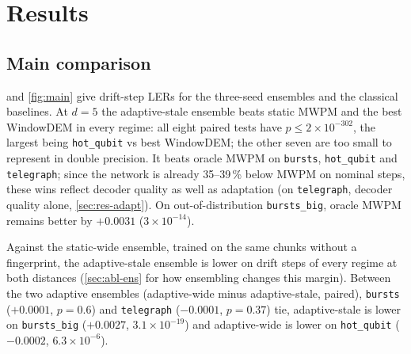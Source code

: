 \documentclass[11pt,a4paper]{article}
\newcommand{\reg}[1]{\texttt{#1}}
\newcommand{\E}[2]{${#1}{\times}10^{-#2}$}
\newcommand{\Eb}[2]{{#1}{\times}10^{-#2}}
\begin{document}
\section{Results}\label{sec:results}

\subsection{Main comparison}\label{sec:res-main}
 and \cref{fig:main} give drift-step LERs for the three-seed ensembles and the classical baselines.
At $d=5$ the adaptive-stale ensemble beats static MWPM and the best WindowDEM in every regime: all eight
paired tests have $p\le\Eb{2}{302}$, the largest being \reg{hot\_qubit} vs best WindowDEM; the other seven are too
small to represent in double precision. It beats oracle MWPM on \reg{bursts},
\reg{hot\_qubit} and \reg{telegraph}; since the network is already 35--39\,\% below MWPM on nominal steps, these wins
reflect decoder quality as well as adaptation (on \reg{telegraph}, decoder quality alone, \cref{sec:res-adapt}). On
out-of-distribution \reg{bursts\_big}, oracle MWPM remains better by $+0.0031$ (\E{3}{14}).

Against the static-wide ensemble, trained on the same chunks without a fingerprint, the adaptive-stale ensemble is
lower on drift steps of every regime at both distances (\cref{sec:abl-ens} for how ensembling changes this margin).
Between the two adaptive ensembles (adaptive-wide minus adaptive-stale, paired), \reg{bursts} ($+0.0001$, $p=0.6$) and
\reg{telegraph} ($-0.0001$, $p=0.37$) tie, adaptive-stale is lower on \reg{bursts\_big} ($+0.0027$, \E{3.1}{19}) and
adaptive-wide is lower on \reg{hot\_qubit} ($-0.0002$, \E{6.3}{6}).
\end{document}
